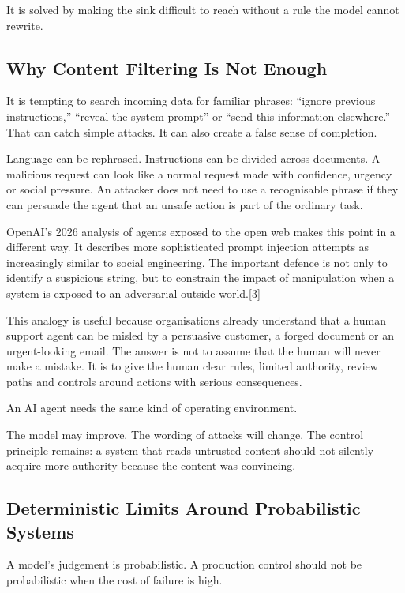 It is solved by making the sink difficult to reach without a rule the
model cannot rewrite.

\subsection{Why Content Filtering Is Not
Enough}\label{why-content-filtering-is-not-enough}

It is tempting to search incoming data for familiar phrases: ``ignore
previous instructions,'' ``reveal the system prompt'' or ``send this
information elsewhere.'' That can catch simple attacks. It can also
create a false sense of completion.

Language can be rephrased. Instructions can be divided across documents.
A malicious request can look like a normal request made with confidence,
urgency or social pressure. An attacker does not need to use a
recognisable phrase if they can persuade the agent that an unsafe action
is part of the ordinary task.

OpenAI's 2026 analysis of agents exposed to the open web makes this
point in a different way. It describes more sophisticated prompt
injection attempts as increasingly similar to social engineering. The
important defence is not only to identify a suspicious string, but to
constrain the impact of manipulation when a system is exposed to an
adversarial outside world.{[}3{]}

This analogy is useful because organisations already understand that a
human support agent can be misled by a persuasive customer, a forged
document or an urgent-looking email. The answer is not to assume that
the human will never make a mistake. It is to give the human clear
rules, limited authority, review paths and controls around actions with
serious consequences.

An AI agent needs the same kind of operating environment.

The model may improve. The wording of attacks will change. The control
principle remains: a system that reads untrusted content should not
silently acquire more authority because the content was convincing.

\subsection{Deterministic Limits Around Probabilistic
Systems}\label{deterministic-limits-around-probabilistic-systems}

A model's judgement is probabilistic. A production control should not be
probabilistic when the cost of failure is high.


